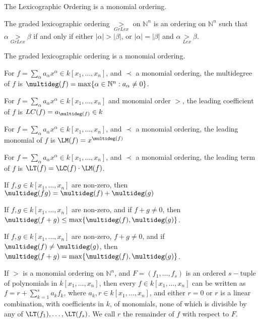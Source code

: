\documentclass[crop=false,class=book]{standalone}
\begin{document}
\begin{theorem}
The Lexicographic Ordering is a monomial ordering.
\end{theorem}
\begin{definition}
The graded lexicographic ordering $\underset{GrLex}{>}$ on $\mathbb{N}^n$ is an ordering on $\mathbb{N}^n$ such that $\alpha \underset{GrLex}{>}\beta$ if and only if either $|\alpha|>|\beta|$, or $|\alpha| = |\beta|$ and $\alpha \underset{Lex}{>}\beta$.
\end{definition}
\begin{theorem}
The graded lexicographic ordering is a monomial ordering.
\end{theorem}
\begin{definition}
For $f=\sum_{\alpha} a_{\alpha} x^\alpha \in k[x_1,\hdots ,x_n]$, and $\prec$ a monomial ordering, the multidegree of $f$ is $\multideg(f) = \max\{\alpha\in\mathbb{N}^n: a_{\alpha} \ne 0\}$.
\end{definition}
\begin{definition}
For $f=\sum_{\alpha}a_\alpha x^\alpha \in k[x_1,\hdots ,x_n]$ and monomial order $>$, the leading coefficient of $f$ is $LC(f) =a_{\multideg(f)}\in k$
\end{definition}
\begin{definition}
For $f=\sum_{\alpha} a_{\alpha} x^\alpha \in k[x_1,\hdots ,x_n]$, and $\prec$ a monomial ordering, the leading monomial of $f$ is $\LM(f) = x^{\multideg(f)}$
\end{definition}
\begin{definition}
For $f=\sum_{\alpha} a_{\alpha} x^{\alpha} \in k[x_1,\hdots ,x_n]$, and $\prec$ a monomial ordering, the leading term of $f$ is $\LT(f) = \LC(f)\cdot \LM(f)$.
\end{definition}
\begin{theorem}
If $f,g\in k[x_1,\hdots ,x_n]$ are non-zero, then $\multideg(fg)=\multideg(f)+\multideg(g)$
\end{theorem}
\begin{theorem}
If $f,g\in k[x_1,\hdots ,x_n]$ are non-zero, and if $f+g \ne 0$, then $\multideg(f+g) \leq \max\{\multideg(f),\multideg(g)\}$.
\end{theorem}
\begin{theorem}
If $f,g\in k[x_1,\hdots ,x_n]$ are non-zero, $f+g\ne 0$, and if $\multideg(f)\ne \multideg(g)$, then $\multideg(f+g) = \max\{\multideg(f),\multideg(g)\}$.
\end{theorem}
\begin{theorem}
If $>$ is a monomial ordering on $\mathbb{N}^n$, and $F = (f_1,\hdots, f_s)$ is an ordered $s-$tuple of polynomials in $k[x_1,\hdots ,x_n]$, then every $f\in k[x_1,\hdots ,x_n]$ can be written as $f = r+\sum_{k=1}^{s} a_k f_k$, where $a_k,r\in k[x_1,\hdots ,x_n]$, and either $r=0$ or $r$ is a linear combination, with coefficients in $k$, of monomials, none of which is divisible by any of $\LT(f_1),\hdots, \LT(f_s)$. We call $r$ the remainder of $f$ with respect to $F$.
\end{theorem}
\end{document}
